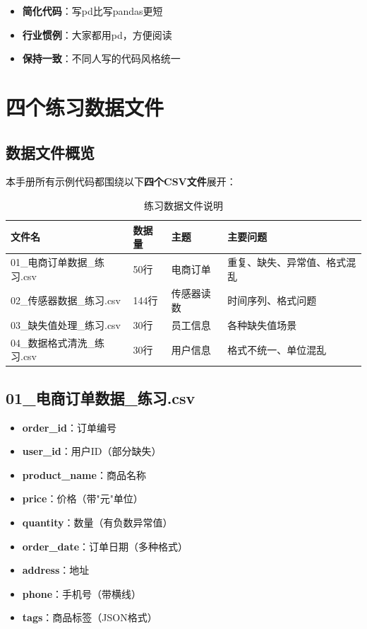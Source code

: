 \documentclass[12pt,a4paper]{article}
\begin{document}
\begin{tipbox}[为什么要用别名pd？]
\begin{itemize}
    \item \textbf{简化代码}：写pd比写pandas更短
    \item \textbf{行业惯例}：大家都用pd，方便阅读
    \item \textbf{保持一致}：不同人写的代码风格统一
\end{itemize}
\end{tipbox}

\section{四个练习数据文件}

\subsection{数据文件概览}

本手册所有示例代码都围绕以下\textbf{四个CSV文件}展开：

\begin{table}[H]
\centering
\caption{练习数据文件说明}
\begin{tabular}{|l|l|l|l|}
\hline
\textbf{文件名} & \textbf{数据量} & \textbf{主题} & \textbf{主要问题} \\
\hline
01\_电商订单数据\_练习.csv & 50行 & 电商订单 & 重复、缺失、异常值、格式混乱 \\
\hline
02\_传感器数据\_练习.csv & 144行 & 传感器读数 & 时间序列、格式问题 \\
\hline
03\_缺失值处理\_练习.csv & 30行 & 员工信息 & 各种缺失值场景 \\
\hline
04\_数据格式清洗\_练习.csv & 30行 & 用户信息 & 格式不统一、单位混乱 \\
\hline
\end{tabular}
\end{table}

\subsection{01\_电商订单数据\_练习.csv}

\begin{knowledgebox}[数据字段说明]
\begin{itemize}
    \item \textbf{order\_id}：订单编号
    \item \textbf{user\_id}：用户ID（部分缺失）
    \item \textbf{product\_name}：商品名称
    \item \textbf{price}：价格（带"元"单位）
    \item \textbf{quantity}：数量（有负数异常值）
    \item \textbf{order\_date}：订单日期（多种格式）
    \item \textbf{address}：地址
    \item \textbf{phone}：手机号（带横线）
    \item \textbf{tags}：商品标签（JSON格式）
\end{itemize}
\end{knowledgebox}
\end{document}
